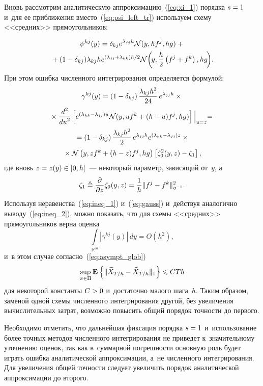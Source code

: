 \begin{multicols}{2}
 Вновь рассмотрим аналитическую аппроксимацию~(\ref{eq:xi_1}) порядка $s\hm=1$ 
 и~для ее приближения вмес\-то~(\ref{eq:psi_left_tr}) используем схему 
 <<средних>> пря\-мо\-уголь\-ников:
 
 \noindent
 \begin{multline*}
 \psi^{kj}(y)=\delta_{kj}e^{\lambda_{jj}h}\mathcal{N}(y,hf^j,hg)
+{}\\
{}+
 (1-\delta_{kj})\lambda_{kj}he^{{(\lambda_{jj}+\lambda_{kk})h}/{2}}
 \mathcal{N}\!\left( \! y,\displaystyle\frac{\displaystyle h\mathstrut}{\displaystyle 2\mathstrut}\left(f^j+f^k\right),hg\!\right)\!.
 \end{multline*}
 При этом ошибка численного интегрирования определяется формулой:
 \begin{multline*} 
 \gamma^{kj}(y)=\left(1-\delta_{kj}\right)
 \displaystyle\frac{\displaystyle \lambda_{kj}h^3\mathstrut}{\displaystyle 24\mathstrut}\,e^{\lambda_{jj}h}\times{}\\
 {}\times
 \displaystyle\frac{\displaystyle d^2\mathstrut}{\displaystyle du^2\mathstrut}\left[
 e^{(\lambda_{kk}-\lambda_{jj})u}\mathcal{N}(y,uf^k+(h-u)f^j,hg)
 \right]\Bigl|_{u=z} = {}\\ 
 {}= 
 \left(1-\delta_{kj}\right)\displaystyle\frac{\displaystyle \lambda_{kj}h^2\mathstrut}{\displaystyle 2\mathstrut}\,e^{\lambda_{jj}h}
 e^{(\lambda_{kk}-\lambda_{jj})z}\times{}\\
 {}\times\mathcal{N}
 \left(y,zf^k+(h-z)f^j,hg\right) \left[\zeta_0^2(y,z)-\zeta_1\right],
 \end{multline*}
 где вновь $z = z (y) \hm\in [0,h]$~--- некоторый параметр, зависящий от~$y$, а
 \begin{equation} 
 \zeta_1 \triangleq \displaystyle\frac{\displaystyle \partial \mathstrut}{\displaystyle \partial z\mathstrut}\zeta_0(y,z)=
 \displaystyle\frac{\displaystyle 1\mathstrut}{\displaystyle h\mathstrut}\|f^j-f^k\|^2_{g^{-1}}.
 \label{eq:zeta_1_def}
 \end{equation}
 Используя неравенства~(\ref{eq:ineq_1}) и~(\ref{eq:gauss})  
 и~действуя аналогично выводу~(\ref{eq:ineq_2}), можно показать, 
 что для схемы <<средних>> прямоугольников верна оценка
$$
 \int\limits_{\mathbb{R}^M}|\gamma^{kj}(y)|\,dy = O(h^2),
$$
 и~в этом случае согласно~(\ref{eq:asympt_glob}) 
 $$
 \mathop{\mathrm{sup}}\limits_{\pi \in \Pi}
 \mathbf{E}_{  }\left\{ \mathop{\|\widetilde{X}_{T/h} - \widehat{X}_{T/h}\|_1} \right\} \leqslant CT h
 $$ 
 для некоторой константы $C\hm > 0$ и~достаточно малого шага~$h$. 
 Таким образом, заменой одной схемы численного интегрирования другой,
  без увеличения вычислительных затрат, возможно повысить общий порядок 
  точ\-ности до первого.

Необходимо отметить, что дальнейшая фиксация порядка $s\hm=1$ и~использование 
более точных методов численного интегрирования не приведет к~значительному 
уточнению оценок, так как в~суммарной погрешности основную роль будет играть 
ошибка аналитической аппроксимации, а~не чис\-лен\-но\-го интегрирования. Для 
увеличения общей точности следует увеличить порядок аналитической 
аппроксимации до второго.


\end{multicols}
